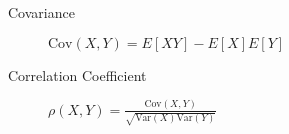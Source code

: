 \documentclass[8pt]{article}
\begin{document}

\begin{multicols}{2}
  \begin{description}
  \item[Covariance] $\text{Cov}(X,Y)=E[XY]-E[X]E[Y]$
  \item[Correlation Coefficient]
    $\rho(X,Y)=\frac{\text{Cov}(X,Y)}{\sqrt{\text{Var}(X)\text{Var}(Y)}}$ 
  \end{description}
\end{multicols}
\end{document}
